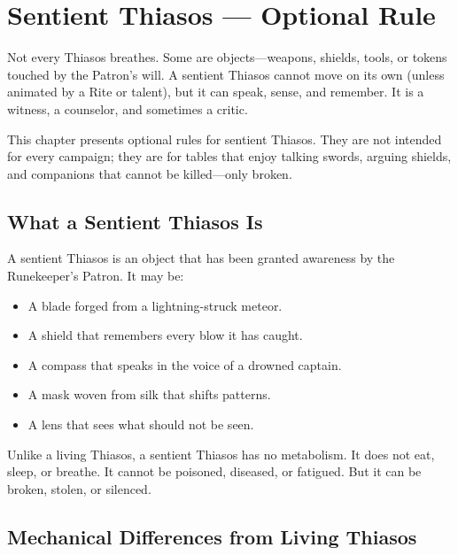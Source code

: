 \section{Sentient Thiasos — Optional Rule}

Not every Thiasos breathes. Some are objects—weapons, shields, tools, or tokens touched by the Patron's will. A sentient Thiasos cannot move on its own (unless animated by a Rite or talent), but it can speak, sense, and remember. It is a witness, a counselor, and sometimes a critic.

This chapter presents optional rules for sentient Thiasos. They are not intended for every campaign; they are for tables that enjoy talking swords, arguing shields, and companions that cannot be killed—only broken.

\subsection{What a Sentient Thiasos Is}

A sentient Thiasos is an object that has been granted awareness by the Runekeeper's Patron. It may be:

\begin{itemize}
\item A blade forged from a lightning-struck meteor.
\item A shield that remembers every blow it has caught.
\item A compass that speaks in the voice of a drowned captain.
\item A mask woven from silk that shifts patterns.
\item A lens that sees what should not be seen.
\end{itemize}

Unlike a living Thiasos, a sentient Thiasos has no metabolism. It does not eat, sleep, or breathe. It cannot be poisoned, diseased, or fatigued. But it can be broken, stolen, or silenced.

\subsection{Mechanical Differences from Living Thiasos}

